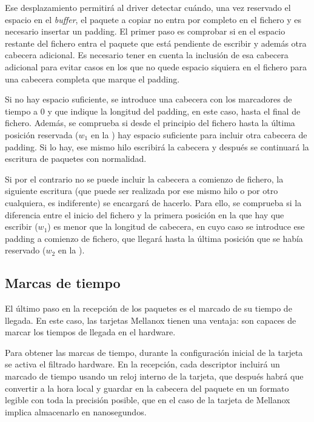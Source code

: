 \documentclass[twoside, 12pt]{epstfg}
\begin{document}
Ese desplazamiento permitirá al \gls{driver} detectar cuándo, una vez reservado el espacio en el \textit{buffer}, el paquete a copiar no entra por completo en el fichero y es necesario insertar un \gls{padding}. El primer paso es comprobar si en el espacio restante del fichero entra el paquete que está pendiente de escribir y además otra cabecera adicional. Es necesario tener en cuenta la inclusión de esa cabecera adicional para evitar casos en los que no quede espacio siquiera en el fichero para una cabecera completa que marque el \gls{padding}.

Si no hay espacio suficiente, se introduce una cabecera con los marcadores de tiempo a 0 y que indique la longitud del \gls{padding}, en este caso, hasta el final de fichero. Además, se comprueba si desde el principio del fichero hasta la última posición reservada ($w_1$ en la ) hay espacio suficiente para incluir otra cabecera de \gls{padding}. Si lo hay, ese mismo hilo escribirá la cabecera y después se continuará la escritura de paquetes con normalidad.

Si por el contrario no se puede incluir la cabecera a comienzo de fichero, la siguiente escritura (que puede ser realizada por ese mismo hilo o por otro cualquiera, es indiferente) se encargará de hacerlo. Para ello, se comprueba si la diferencia entre el inicio del fichero y la primera posición en la que hay que escribir ($w_1$) es menor que la longitud de cabecera, en cuyo caso se introduce ese \gls{padding} a comienzo de fichero, que llegará hasta la última posición que se había reservado ($w_2$ en la ).

\subsection{Marcas de tiempo}

El último paso en la recepción de los paquetes es el marcado de su tiempo de llegada. En este caso, las tarjetas Mellanox tienen una ventaja: son capaces de marcar los tiempos de llegada en el hardware.

Para obtener las marcas de tiempo, durante la configuración inicial de la tarjeta se activa el filtrado hardware. En la recepción, cada descriptor incluirá un marcado de tiempo usando un reloj interno de la tarjeta, que después habrá que convertir a la hora local y guardar en la cabecera del paquete en un formato legible con toda la precisión posible, que en el caso de la tarjeta de Mellanox implica almacenarlo en nanosegundos.
\end{document}
